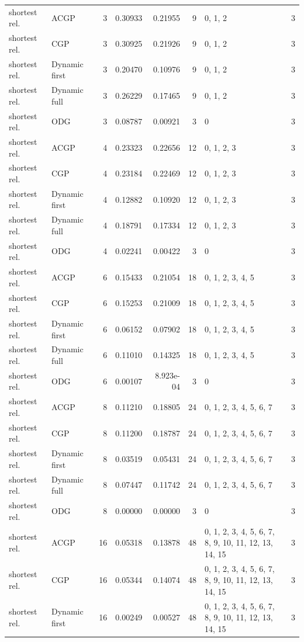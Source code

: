 \documentclass[10pt,a4paper]{article}
\begin{document}
\begin{longtable}{@{}p{23mm}p{29mm}rrrrp{36mm}r@{}}
shortest rel. & ACGP & 3 & 0.30933 & 0.21955 & 9 & 0, 1, 2 & 3 \\
shortest rel. & CGP & 3 & 0.30925 & 0.21926 & 9 & 0, 1, 2 & 3 \\
shortest rel. & Dynamic first & 3 & 0.20470 & 0.10976 & 9 & 0, 1, 2 & 3 \\
shortest rel. & Dynamic full & 3 & 0.26229 & 0.17465 & 9 & 0, 1, 2 & 3 \\
shortest rel. & ODG & 3 & 0.08787 & 0.00921 & 3 & 0 & 3 \\
shortest rel. & ACGP & 4 & 0.23323 & 0.22656 & 12 & 0, 1, 2, 3 & 3 \\
shortest rel. & CGP & 4 & 0.23184 & 0.22469 & 12 & 0, 1, 2, 3 & 3 \\
shortest rel. & Dynamic first & 4 & 0.12882 & 0.10920 & 12 & 0, 1, 2, 3 & 3 \\
shortest rel. & Dynamic full & 4 & 0.18791 & 0.17334 & 12 & 0, 1, 2, 3 & 3 \\
shortest rel. & ODG & 4 & 0.02241 & 0.00422 & 3 & 0 & 3 \\
shortest rel. & ACGP & 6 & 0.15433 & 0.21054 & 18 & 0, 1, 2, 3, 4, 5 & 3 \\
shortest rel. & CGP & 6 & 0.15253 & 0.21009 & 18 & 0, 1, 2, 3, 4, 5 & 3 \\
shortest rel. & Dynamic first & 6 & 0.06152 & 0.07902 & 18 & 0, 1, 2, 3, 4, 5 & 3 \\
shortest rel. & Dynamic full & 6 & 0.11010 & 0.14325 & 18 & 0, 1, 2, 3, 4, 5 & 3 \\
shortest rel. & ODG & 6 & 0.00107 & 8.923e-04 & 3 & 0 & 3 \\
shortest rel. & ACGP & 8 & 0.11210 & 0.18805 & 24 & 0, 1, 2, 3, 4, 5, 6, 7 & 3 \\
shortest rel. & CGP & 8 & 0.11200 & 0.18787 & 24 & 0, 1, 2, 3, 4, 5, 6, 7 & 3 \\
shortest rel. & Dynamic first & 8 & 0.03519 & 0.05431 & 24 & 0, 1, 2, 3, 4, 5, 6, 7 & 3 \\
shortest rel. & Dynamic full & 8 & 0.07447 & 0.11742 & 24 & 0, 1, 2, 3, 4, 5, 6, 7 & 3 \\
shortest rel. & ODG & 8 & 0.00000 & 0.00000 & 3 & 0 & 3 \\
shortest rel. & ACGP & 16 & 0.05318 & 0.13878 & 48 & 0, 1, 2, 3, 4, 5, 6, 7, 8, 9, 10, 11, 12, 13, 14, 15 & 3 \\
shortest rel. & CGP & 16 & 0.05344 & 0.14074 & 48 & 0, 1, 2, 3, 4, 5, 6, 7, 8, 9, 10, 11, 12, 13, 14, 15 & 3 \\
shortest rel. & Dynamic first & 16 & 0.00249 & 0.00527 & 48 & 0, 1, 2, 3, 4, 5, 6, 7, 8, 9, 10, 11, 12, 13, 14, 15 & 3 \\

\end{longtable}
\end{document}
